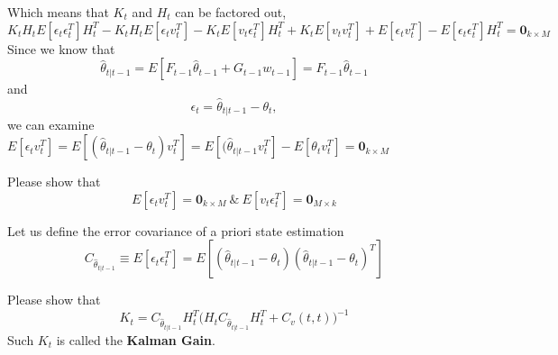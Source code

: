 \documentclass[a4 paper]{article}
\begin{document}
Which means that $K_t$ and $H_t$ can be factored out, 
\begin{equation}
    K_tH_tE[\epsilon_t\epsilon_t^T]H^T_t-K_tH_tE[\epsilon_tv^T_t ] - K_tE [ v_t\epsilon_t^T]H^T_t + K_tE[ v_tv^T_t ] + E[\epsilon_tv^T_t]-E[\epsilon_t\epsilon_t^T ]H^T_t = \textbf{0}_{k\times M}
\end{equation}
Since we know that 
\begin{equation}
    \hat{\theta}_{t|t-1} = E[F_{t-1}\hat{\theta}_{t-1}+ G_{t-1}w_{t -1}]=F_{t-1}\hat{\theta}_{t-1}
\end{equation}
and $$\epsilon_t=\hat{\theta}_{t|t-1}-\theta_t,$$
we can examine $E[\epsilon_tv_t^T]=E[(\hat{\theta}_{t|t-1}-\theta_t)v_t^T]=E[(\hat{\theta}_{t|t-1}v_t^T]-E[\theta_tv_t^T]=\textbf{0}_{k\times M}$
\begin{tcolorbox}[colback=RubineRed!5!white,colframe=RubineRed!75!black]
Please show that 
\begin{equation}
    E[\epsilon_tv_t^T]=\textbf{0}_{k\times M} \ \& \ E[v_t\epsilon_t^T]=\textbf{0}_{M\times k}
\end{equation}
\end{tcolorbox}
Let us define the error covariance of a priori state estimation
\begin{equation}
    C_{\hat{\theta}_{t|t-1}}\equiv E[\epsilon_t\epsilon_t^T]=E[(\hat{\theta}_{t|t-1}-\theta_t)(\hat{\theta}_{t|t-1}-\theta_t)^T]
\end{equation}
\begin{tcolorbox}[colback=RubineRed!5!white,colframe=RubineRed!75!black]
Please show that 
\begin{equation}
    K_t=C_{\hat{\theta}_{t|t-1}}H_t^T\Big(H_tC_{\hat{\theta}_{t|t-1}}H_t^T+C_v(t,t)\Big)^{-1}
\end{equation}
Such $K_t$ is called the \textbf{Kalman Gain}. 
\end{tcolorbox}
\end{document}
